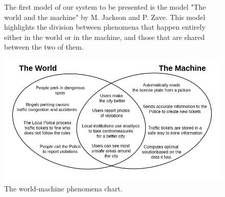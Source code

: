 \begin{figure}[htp]
	\begin{flushleft}
		The first model of our system to be presented is the model "The world and the machine" by M. Jackson and P. Zave. This model highlights the division between phenomena that happen entirely either in the world or in the machine, and those that are shared between the two of them.
	\end{flushleft}
	\centering
	\includegraphics[scale=0.50]{images/world-machine-phenomena}
	\caption{The world-machine phenomena chart.}
	\label{fig:world-machine}
\end{figure}
